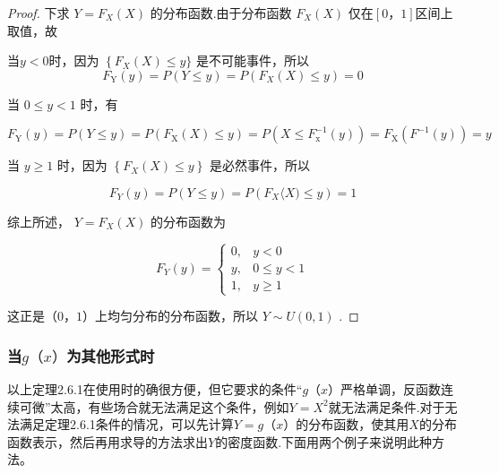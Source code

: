 \begin{proof}
	下求 $Y=F_{X}(X)$ 的分布函数.由于分布函数 $ F_{X}(X)$ 仅在$ [0，1] $区间上取值，故
	
	当$ y<0 $时，因为 $\left\{F_{X}(X) \leqslant y\right.\}$ 是不可能事件，所以 \[
	F_{\mathrm{Y}}(y)=P(Y \leqslant y)=P\left(F_{X}(X) \leqslant y\right)=0
	\]
	
	当 $0 \leqslant y<1$ 时，有
	
	\[
	F_{\mathrm{Y}}(y)=P(Y \leqslant y)=P\left(F_{\mathrm{X}}(X) \leqslant y\right)=P\left(X \leqslant F_{\mathrm{x}}^{-1}(y)\right)=F_{\mathrm{X}}\left(F^{-1}(y)\right)=y
	\]
	
	当 $y \geqslant 1$ 时，因为 $\left\{F_{X}(X) \leqslant y\right\}$ 是必然事件，所以
	
	\[
	F_{Y}(y)=P(Y \leqslant y)=P\left(F_{X}\langle X) \leqslant y\right)=1
	\]
	
	综上所述， $Y=F_{X}(X)$ 的分布函数为
	
	\[
	F_{Y}(y)=\left\{\begin{array}{ll}{0,} & {y<0} \\ {y,} & {0 \leqslant y<1} \\ {1,} & {y \geqslant 1}\end{array}\right.
	\]
	
	这正是$ （0，1） $上均匀分布的分布函数，所以 $Y \sim U(0,1)$ .
\end{proof}

\subsubsection{当$ g（x） $为其他形式时}

以上定理2.6.1在使用时的确很方便，但它要求的条件“$ g（x） $严格单调，反函数连续可微”太高，有些场合就无法满足这个条件，例如$ Y=X^{2} $就无法满足条件.对于无法满足定理2.6.1条件的情况，可以先计算$ Y=g（x） $的分布函数，使其用$ X $的分布函数表示，然后再用求导的方法求出$ Y $的密度函数.下面用两个例子来说明此种方法。

